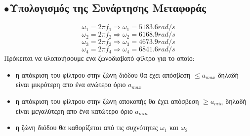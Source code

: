\documentclass{article}
\begin{document}
{  \subsection*{$\bullet$Υπολογισμός της Συνάρτησης Μεταφοράς}
 

\begin{equation*}
ω_1 = 2πf_1 \Rightarrow \boxed{ω_1 = 5183.6 rad/s}
\end{equation*}
\begin{equation*}
ω_2 = 2πf_2 \Rightarrow \boxed{ω_2 = 6168.9 rad/s}
\end{equation*}
\begin{equation*}
ω_3 = 2πf_3 \Rightarrow \boxed{ω_3 = 4673.9 rad/s}
\end{equation*}
\begin{equation*}
ω_4 = 2πf_4 \Rightarrow \boxed{ω_4 = 6841.6 rad/s}
\end{equation*}
Πρόκειται να υλοποιήσουμε ενα ζωνοδιαβατό φίλτρο για το οποίο:
\begin{itemize}
  \item η απόκριση του φίλτρου στην ζώνη διόδου θα έχει απόσβεση $\leq a_{max}$ δηλαδή είναι μικρότερη απο ένα ανώτερο όριο $a_{max}$ 
  \item η απόκριση του φίλτρου στην ζώνη αποκοπής θα έχει απόσβεση $\geq a_{min}$ δηλαδή είναι μεγαλύτερη απο ένα κατώτερο όριο $a_{min}$
  \item η ζώνη διόδου θα καθορίζεται από τις συχνότητες $ω_1$ και $ω_2$
     

\end{itemize}}
\end{document}
